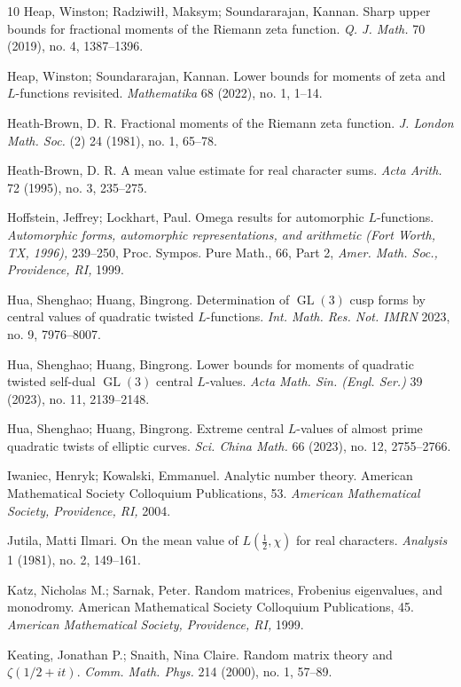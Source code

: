 \documentclass[12pt,reqno]{amsart}
\numberwithin{equation}{section}
\theoremstyle{plain}
\theoremstyle{definition}
\theoremstyle{remark}
\newcommand{\GL}{\operatorname{GL}}
\begin{document}
\begin{thebibliography}{10}
Heap, Winston; Radziwi{\l \l}, Maksym; Soundararajan, Kannan.
Sharp upper bounds for fractional moments of the Riemann zeta function.
\emph{Q. J. Math.} 70 (2019), no. 4, 1387--1396.

Heap, Winston; Soundararajan, Kannan.
Lower bounds for moments of zeta and $L$-functions revisited.
\emph{Mathematika} 68 (2022), no. 1, 1--14.

Heath-Brown, D. R.
Fractional moments of the Riemann zeta function.
\emph{J. London Math. Soc.} (2) 24 (1981), no. 1, 65--78.

Heath-Brown, D. R.
A mean value estimate for real character sums.
\emph{Acta Arith.} 72 (1995), no. 3, 235--275.

Hoffstein, Jeffrey; Lockhart, Paul.
Omega results for automorphic $L$-functions. \emph{Automorphic forms, automorphic representations, and arithmetic (Fort Worth, TX, 1996),} 239–250, Proc. Sympos. Pure Math., 66, Part 2, \emph{Amer. Math. Soc., Providence, RI,} 1999.

Hua, Shenghao; Huang, Bingrong.
Determination of $\GL(3)$ cusp forms by central values of quadratic twisted  $L$-functions.
\emph{Int. Math. Res. Not. IMRN} 2023, no. 9, 7976--8007.

Hua, Shenghao; Huang, Bingrong.
Lower bounds for moments of quadratic twisted self-dual $\GL(3)$ central $L$-values.
\emph{Acta Math. Sin. (Engl. Ser.)} 39 (2023), no. 11, 2139--2148.

Hua, Shenghao; Huang, Bingrong.
Extreme central $L$-values of almost prime quadratic twists of elliptic curves.
\emph{Sci. China Math.} 66 (2023), no. 12, 2755--2766.

Iwaniec, Henryk; Kowalski, Emmanuel.
Analytic number theory.
American Mathematical Society Colloquium Publications, 53.
\emph{American Mathematical Society, Providence, RI,} 2004.

Jutila, Matti Ilmari.
On the mean value of $L(\frac{1}{2},\chi)$ for real characters.
\emph{Analysis} 1 (1981), no. 2, 149--161.

Katz, Nicholas M.; Sarnak, Peter.
Random matrices, Frobenius eigenvalues, and monodromy.
American Mathematical Society Colloquium Publications, 45.
\emph{American Mathematical Society, Providence, RI,} 1999.

Keating, Jonathan P.; Snaith, Nina Claire.
Random matrix theory and $\zeta(1/2+it)$. \emph{Comm. Math. Phys.} 214 (2000), no. 1, 57--89.


\end{thebibliography}
\end{document}
